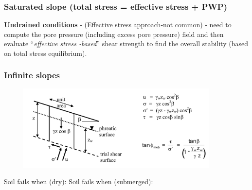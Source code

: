 \documentclass[notes]{beamer}
\begin{document}
\begin{frame}
\frametitle{Saturated slope (total stress = effective stress + PWP)}
\textbf{Undrained conditions} ‐ (Effective stress approach‐not common) ‐ need to
compute the pore pressure (including excess pore pressure) field and then
evaluate ``\textit{effective stress ‐based}'' shear strength to find the overall stability
(based on total stress equilibrium).
\end{frame}

\begin{frame}
\frametitle{Infinite slopes}
\begin{figure}[ht]
	\centering
	\includegraphics[width=0.9\textwidth]{figs/infinite-slope.png}
\end{figure}
Soil fails when (dry): 
Soil fails when (submerged): 
\end{frame}
\end{document}
